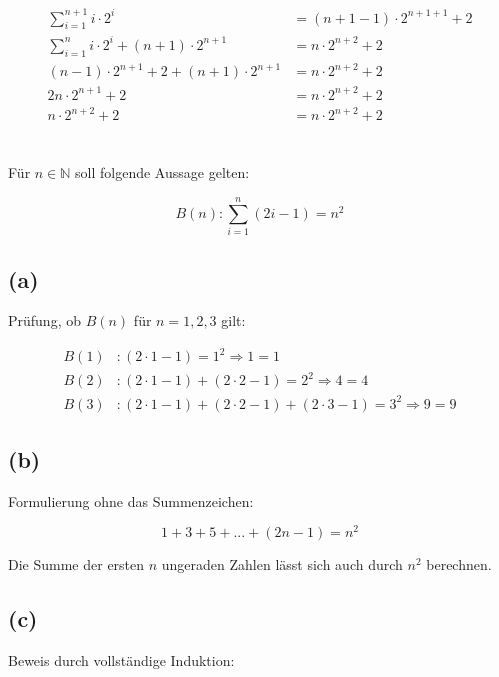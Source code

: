 \documentclass[11pt,a4paper]{article}
\begin{document}
\begin{align*}
    \sum_{i=1}^{n+1}{i \cdot 2^i} &= (n+1-1) \cdot 2^{n+1+1}+2\\
    \sum_{i=1}^{n}{i \cdot 2^i} + (n+1) \cdot 2^{n+1} &= n \cdot 2^{n+2} + 2\\
    (n-1) \cdot 2^{n+1}+2 + (n+1) \cdot 2^{n+1} &= n \cdot 2^{n+2} + 2\\
    2n \cdot 2^{n+1} + 2 &= n \cdot 2^{n+2} + 2\\
    n \cdot 2^{n+2} +2 &= n \cdot 2^{n+2} + 2 \tag*{\checkmark}
\end{align*}

\section{} Für $n \in \mathbb{N}$ soll folgende Aussage gelten:

\begin{equation*}
    B(n): \sum_{i=1}^{n}{(2i-1)} = n^2
\end{equation*}

\subsection*{(a)} Prüfung, ob $B(n)$ für $n = 1, 2, 3$ gilt:

\begin{align*}
    B(1) &: (2 \cdot 1 - 1) = 1^2 \Rightarrow 1 = 1 \tag*{\checkmark}\\
    B(2) &: (2 \cdot 1 - 1) + (2 \cdot 2 - 1) = 2^2 \Rightarrow 4 = 4 \tag*{\checkmark}\\
    B(3) &: (2 \cdot 1 - 1) + (2 \cdot 2 - 1) + (2 \cdot 3 - 1) = 3^2 \Rightarrow 9 = 9 \tag*{\checkmark}
\end{align*}

\subsection*{(b)} Formulierung ohne das Summenzeichen:

\begin{equation*}
1+3+5+...+(2n-1) = n^2
\end{equation*}

\noindent
Die Summe der ersten $n$ ungeraden Zahlen lässt sich auch durch $n^2$ berechnen.

\subsection*{(c)} Beweis durch vollständige Induktion:
\end{document}
